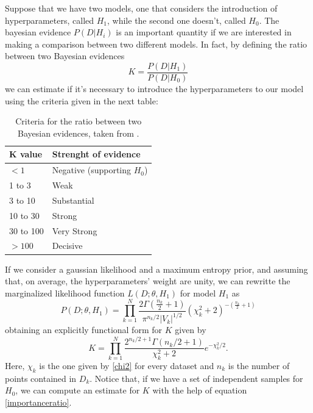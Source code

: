 \documentclass[onecolumn,           %
               showpacs,            %
               preprintnumbers,     %
               aps,                 %
               prl,          	    %
               letterpaper,             %
               superscriptaddress,      %
               nofootinbib,         %
               tightenlines,        %
               floats,floatfix      %
               ,usenatbib,
               ]{revtex4-1}
\begin{document}
Suppose that we have two models, one that considers the introduction of hyperparameters, called $H_1$, while the second one doesn't, called $H_0$. The bayesian evidence $P(D|H_i)$ is an important quantity if we are interested in making a comparison between two different models. In fact, by defining the ratio between two Bayesian evidences
\begin{equation}
K=\frac{P(D|H_1)}{P(D|H_0)}
\end{equation}
we can estimate if it's necessary to introduce the hyperparameters to our model using the criteria given in the next table:
\begin{table}[h!]
\centering
\begin{tabular}{||l|l||} 
 \hline
 \textbf{K value} & \textbf{Strenght of evidence} \\ [0.5ex] 
 \hline\hline
 $<1$  & Negative (supporting $H_0$)   \\ 
 \hline
 1 to 3 & Weak \\
 \hline 
3 to 10 & Substantial\\
\hline
10 to 30 & Strong\\
\hline
30 to 100 & Very Strong \\
\hline
$>100$ & Decisive\\ [1ex] 
 \hline
\end{tabular}\label{evidence}
\caption{Criteria for the ratio between two Bayesian evidences, taken from \cite{hiperp2}.}
\end{table}

If we consider a gaussian likelihood and a maximum entropy prior, and assuming that, on average, the hyperparameters' weight are unity, we can rewritte the marginalized likelihood function $L(D;\theta,H_1)$ for model $H_1$ as
\begin{equation}
P(D;\theta,H_1)=\prod_{k=1}^N\frac{2\Gamma(\frac{n_k}{2}+1)}{\pi^{n_k/2}|V_k|^{1/2}}(\chi_k^2+2)^{-\left(\frac{n_k}{2}+1\right)}
\end{equation}
obtaining an explicitly functional form for $K$ given by
\begin{equation}
K=\prod_{k=1}^N\frac{2^{n_k/2+1}\Gamma(n_k/2+1)}{\chi^2_k+2}e^{-\chi_k^2/2}.
\end{equation}
Here, $\chi_k$ is the one given by \ref{chi2} for every dataset and $n_k$ is the number of points contained in $D_k$. Notice that, if we have a set of independent samples for $H_0$, we can compute an estimate for $K$ with the help of equation \eqref{importanceratio}. 
\end{document}
